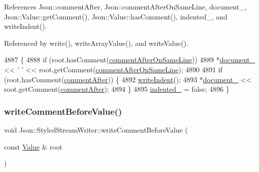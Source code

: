 References Json\+::comment\+After, Json\+::comment\+After\+On\+Same\+Line, document\+\_\+, Json\+::\+Value\+::get\+Comment(), Json\+::\+Value\+::has\+Comment(), indented\+\_\+, and write\+Indent().



Referenced by write(), write\+Array\+Value(), and write\+Value().


\begin{DoxyCode}
4887                                                                            \{
4888   \textcolor{keywordflow}{if} (root.hasComment(\hyperlink{namespace_json_a4fc417c23905b2ae9e2c47d197a45351a008a230a0586de54f30b76afe70fdcfa}{commentAfterOnSameLine}))
4889     *\hyperlink{class_json_1_1_styled_stream_writer_aa8c4e4576f5c3dcb10955d133a092dd6}{document\_} << \textcolor{charliteral}{' '} << root.getComment(\hyperlink{namespace_json_a4fc417c23905b2ae9e2c47d197a45351a008a230a0586de54f30b76afe70fdcfa}{commentAfterOnSameLine});
4890 
4891   \textcolor{keywordflow}{if} (root.hasComment(\hyperlink{namespace_json_a4fc417c23905b2ae9e2c47d197a45351ac5784ca53b12250888ddb642b06aebef}{commentAfter})) \{
4892     \hyperlink{class_json_1_1_styled_stream_writer_a5a52fa5b406f1580a61dde3b5638e76d}{writeIndent}();
4893     *\hyperlink{class_json_1_1_styled_stream_writer_aa8c4e4576f5c3dcb10955d133a092dd6}{document\_} << root.getComment(\hyperlink{namespace_json_a4fc417c23905b2ae9e2c47d197a45351ac5784ca53b12250888ddb642b06aebef}{commentAfter});
4894   \}
4895   \hyperlink{class_json_1_1_styled_stream_writer_aa12db1753619a9b48da41f3e45e3275d}{indented\_} = \textcolor{keyword}{false};
4896 \}
\end{DoxyCode}
\mbox{\label{class_json_1_1_styled_stream_writer_a79c3c2b320475035c47b2db484a3e434}} 
\subsubsection{\texorpdfstring{write\+Comment\+Before\+Value()}{writeCommentBeforeValue()}}
{\footnotesize\ttfamily void Json\+::\+Styled\+Stream\+Writer\+::write\+Comment\+Before\+Value (\begin{DoxyParamCaption}\item[{const \hyperlink{class_json_1_1_value}{Value} \&}]{root }\end{DoxyParamCaption})\hspace{0.3cm}{\ttfamily [private]}}



